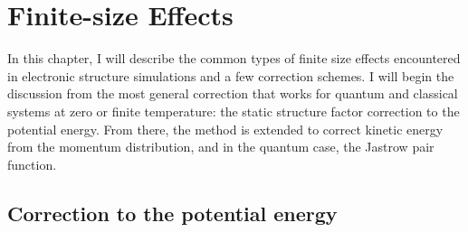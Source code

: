 \chapter{Finite-size Effects} \label{chap:fsc}
In this chapter, I will describe the common types of finite size effects encountered in electronic structure simulations and a few correction schemes. I will begin the discussion from the most general correction that works for quantum and classical systems at zero or finite temperature: the static structure factor correction to the potential energy. From there, the method is extended to correct kinetic energy from the momentum distribution, and in the quantum case, the Jastrow pair function. %

\section{Correction to the potential energy}

